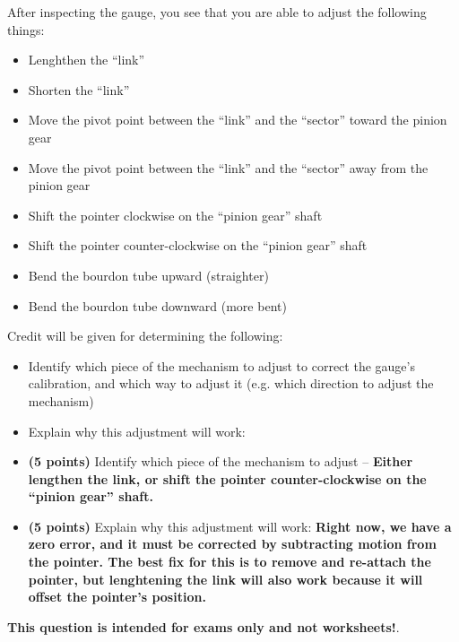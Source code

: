 \vskip 10pt

After inspecting the gauge, you see that you are able to adjust the following things:

\begin{itemize}
\item{} Lenghthen the ``link''
\item{} Shorten the ``link''
\item{} Move the pivot point between the ``link'' and the ``sector'' toward the pinion gear
\item{} Move the pivot point between the ``link'' and the ``sector'' away from the pinion gear
\item{} Shift the pointer clockwise on the ``pinion gear'' shaft
\item{} Shift the pointer counter-clockwise on the ``pinion gear'' shaft
\item{} Bend the bourdon tube upward (straighter)
\item{} Bend the bourdon tube downward (more bent)
\end{itemize}

\vskip 10pt

\noindent
Credit will be given for determining the following:

\begin{itemize}
\item{} Identify which piece of the mechanism to adjust to correct the gauge's calibration, and which way to adjust it (e.g. which direction to adjust the mechanism)
\vskip 5pt
\item{} Explain why this adjustment will work:
\end{itemize}







\begin{itemize}
\item{} {\bf (5 points)} Identify which piece of the mechanism to adjust -- {\bf Either lengthen the link, or shift the pointer counter-clockwise on the ``pinion gear'' shaft.}
\vskip 5pt
\item{} {\bf (5 points)} Explain why this adjustment will work: {\bf Right now, we have a zero error, and it must be corrected by subtracting motion from the pointer.  The best fix for this is to remove and re-attach the pointer, but lenghtening the link will also work because it will offset the pointer's position.}
\end{itemize}







{\bf This question is intended for exams only and not worksheets!}.



